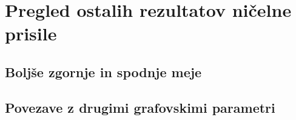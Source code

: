 \documentclass[12pt,a4paper,twoside]{article}
\theoremstyle{definition} %
\theoremstyle{plain} %
\numberwithin{equation}{section}  %
\begin{document}
\section{Pregled ostalih rezultatov ničelne prisile}
\subsection{Boljše zgornje in spodnje meje}

\subsection{Povezave z drugimi grafovskimi parametri}


\cleardoublepage                           %
\end{document}

